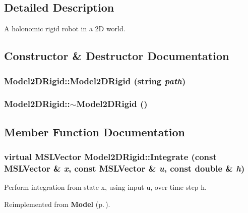 \subsection{Detailed Description}
A holonomic rigid robot in a 2D world.



\subsection{Constructor \& Destructor Documentation}
\subsubsection{\setlength{\rightskip}{0pt plus 5cm}Model2DRigid::Model2DRigid (string {\em path})}\label{class_Model2DRigid_a0}


\subsubsection{\setlength{\rightskip}{0pt plus 5cm}Model2DRigid::$\sim$Model2DRigid ()\hspace{0.3cm}{\tt  [inline, virtual]}}\label{class_Model2DRigid_a1}




\subsection{Member Function Documentation}
\subsubsection{\setlength{\rightskip}{0pt plus 5cm}virtual {\bf MSLVector} Model2DRigid::Integrate (const {\bf MSLVector} \& {\em x}, const {\bf MSLVector} \& {\em u}, const double \& {\em h})\hspace{0.3cm}{\tt  [virtual]}}\label{class_Model2DRigid_a2}


Perform integration from state x, using input u, over time step h.



Reimplemented from {\bf Model} {\rm (p.\,\pageref{class_Model_a5})}.

